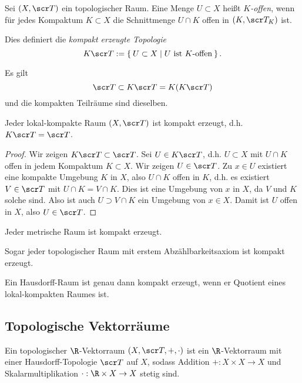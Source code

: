 \begin{df}
	Sei $(X, \scr T)$ ein topologischer Raum.
	Eine Menge $U \subset X$ heißt \emph{$K$-offen}, wenn für jedes Kompaktum $K \subset X$ die Schnittmenge $U \cap K$ offen in $(K, \scr T_K)$ ist.

	Dies definiert die \emph{kompakt erzeugte Topologie}
	\[
		K \scr T :=
		\Set{ U \subset X | U \text{ ist $K$-offen} }.
	\]
\end{df}

\begin{lem}
	Es gilt
	\[
		\scr T \subset K \scr T = K(K \scr T)
	\]
	und die kompakten Teilräume sind dieselben.
\end{lem}

\begin{st}
	Jeder lokal-kompakte Raum $(X, \scr T)$ ist kompakt erzeugt, d.h. $K \scr T = \scr T$.
	\begin{proof}
		Wir zeigen $K \scr T \subset \scr T$.
		Sei $U \in K \scr T$, d.h. $U \subset X$ mit $U \cap K$ offen in jedem Kompaktum $K \subset X$.
		Wir zeigen $U \in \scr T$.
		Zu $x \in U$ existiert eine kompakte Umgebung $K$ in $X$, also $U \cap K$ offen in $K$, d.h. es existiert $V \in \scr T$ mit $U \cap K = V \cap K$.
		Dies ist eine Umgebung von $x$ in $X$, da $V$ und $K$ solche sind.
		Also ist auch $U \supset V \cap K$ ein Umgebung von $x \in X$.
		Damit ist $U$ offen in $X$, also $U \in \scr T$.
	\end{proof}
\end{st}


\begin{st}
	Jeder metrische Raum ist kompakt erzeugt.

	Sogar jeder topologischer Raum mit erstem Abzählbarkeitsaxiom ist kompakt erzeugt.
\end{st}

\begin{st}
	Ein Hausdorff-Raum ist genau dann kompakt erzeugt, wenn er Quotient eines lokal-kompakten Raumes ist.
\end{st}

\subsection{Topologische Vektorräume}

\begin{df}
	Ein topologischer $\R$-Vektorraum $(X, \scr T, +, \cdot)$ ist ein $\R$-Vektorraum mit einer Hausdorff-Topologie $\scr T$ auf $X$, sodass Addition $+: X\times X \to X$ und Skalarmultiplikation $\cdot: \R \times X \to X$ stetig sind.
\end{df}

